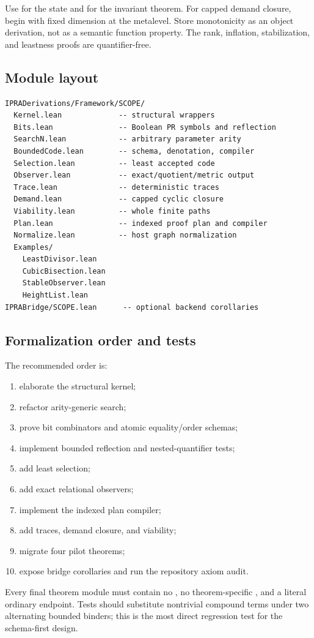 Use  for the state and  for the invariant theorem.
For capped demand closure, begin with fixed dimension at the metalevel.  Store
monotonicity as an object derivation, not as a semantic function property.  The
rank, inflation, stabilization, and leastness proofs are quantifier-free.

\subsection{Module layout}

\begin{verbatim}
IPRADerivations/Framework/SCOPE/
  Kernel.lean             -- structural wrappers
  Bits.lean               -- Boolean PR symbols and reflection
  SearchN.lean            -- arbitrary parameter arity
  BoundedCode.lean        -- schema, denotation, compiler
  Selection.lean          -- least accepted code
  Observer.lean           -- exact/quotient/metric output
  Trace.lean              -- deterministic traces
  Demand.lean             -- capped cyclic closure
  Viability.lean          -- whole finite paths
  Plan.lean               -- indexed proof plan and compiler
  Normalize.lean          -- host graph normalization
  Examples/
    LeastDivisor.lean
    CubicBisection.lean
    StableObserver.lean
    HeightList.lean
IPRABridge/SCOPE.lean      -- optional backend corollaries
\end{verbatim}

\subsection{Formalization order and tests}

The recommended order is:

\begin{enumerate}[label=\textbf{M\arabic*.}]
\item elaborate the structural kernel;
\item refactor arity-generic search;
\item prove bit combinators and atomic equality/order schemas;
\item implement bounded reflection and nested-quantifier tests;
\item add least selection;
\item add exact relational observers;
\item implement the indexed plan compiler;
\item add traces, demand closure, and viability;
\item migrate four pilot theorems;
\item expose bridge corollaries and run the repository axiom audit.
\end{enumerate}

Every final theorem module must contain no , no theorem-specific
, and a literal ordinary endpoint.  Tests should substitute
nontrivial compound terms under two alternating bounded binders; this is the
most direct regression test for the schema-first design.

